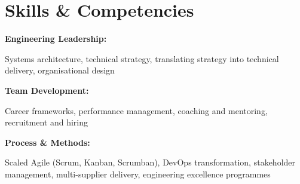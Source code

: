 %
%
\section{Skills \& Competencies}
\location{}
\newline
\vspace{0.02em}
\textbf{Engineering Leadership:} \newline
\vspace{-\topsep}
\vspace{-0.4em}
\begin{tightemize}
    \item Systems architecture, technical strategy, translating strategy into technical delivery, organisational design
\end{tightemize}
\vspace{0.02em}
\textbf{Team Development:} \newline
\vspace{-\topsep}
\vspace{-0.4em}
\begin{tightemize}
    \item Career frameworks, performance management, coaching and mentoring, recruitment and hiring
\end{tightemize}
\vspace{0.02em}
\textbf{Process \& Methods:} \newline
\vspace{-\topsep}
\vspace{-0.4em}
\begin{tightemize}
    \item Scaled Agile (Scrum, Kanban, Scrumban), DevOps transformation, stakeholder management, multi-supplier delivery, engineering excellence programmes
\end{tightemize}
\sectionsep{}

